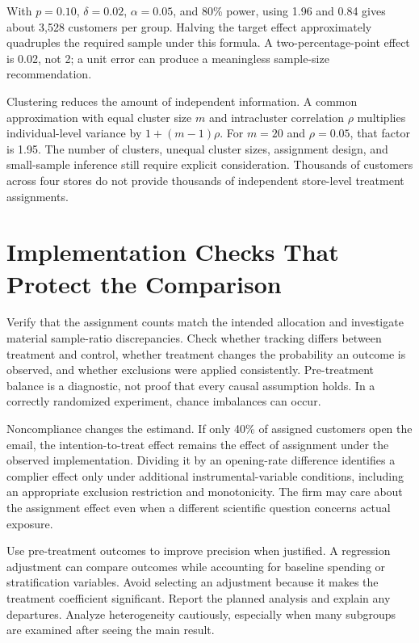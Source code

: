 With \(p=0.10\), \(\delta=0.02\), \(\alpha=0.05\), and 80\% power, using
1.96 and 0.84 gives about 3,528 customers per group. Halving the target
effect approximately quadruples the required sample under this formula.
A two-percentage-point effect is 0.02, not 2; a unit error can produce a
meaningless sample-size recommendation.

Clustering reduces the amount of independent information. A common
approximation with equal cluster size \(m\) and intracluster correlation
\(\rho\) multiplies individual-level variance by \(1+(m-1)\rho\). For
\(m=20\) and \(\rho=0.05\), that factor is 1.95. The number of clusters,
unequal cluster sizes, assignment design, and small-sample inference
still require explicit consideration. Thousands of customers across four
stores do not provide thousands of independent store-level treatment
assignments.

\hypertarget{M06-implementation-checks-that-protect-the-comparison}{%
\section{Implementation Checks That Protect the
Comparison}\label{M06-implementation-checks-that-protect-the-comparison}}

\noindent Verify that the assignment counts match the intended allocation and
investigate material sample-ratio discrepancies. Check whether tracking
differs between treatment and control, whether treatment changes the
probability an outcome is observed, and whether exclusions were applied
consistently. Pre-treatment balance is a diagnostic, not proof that
every causal assumption holds. In a correctly randomized experiment,
chance imbalances can occur.

Noncompliance changes the estimand. If only 40\% of assigned customers
open the email, the intention-to-treat effect remains the effect of
assignment under the observed implementation. Dividing it by an
opening-rate difference identifies a complier effect only under
additional instrumental-variable conditions, including an appropriate
exclusion restriction and monotonicity. The firm may care about the
assignment effect even when a different scientific question concerns
actual exposure.

Use pre-treatment outcomes to improve precision when justified. A
regression adjustment can compare outcomes while accounting for baseline
spending or stratification variables. Avoid selecting an adjustment
because it makes the treatment coefficient significant. Report the
planned analysis and explain any departures. Analyze heterogeneity
cautiously, especially when many subgroups are examined after seeing the
main result.

